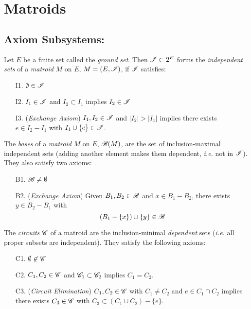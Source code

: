 \section{Matroids}

\subsection{Axiom Subsystems:}

\begin{definition}
    Let $E$ be a finite set called the \textit{ground set}.
    Then $\mathscr{I} \subset 2^E$ forms the \textit{independent sets} of a \textit{matroid} $M$ on $E$, $M = (E, \mathscr{I})$, if $\mathscr{I}$ satisfies:
    \begin{enumerate}
        \item[I1.] $\emptyset \in \mathscr{I}$
        \item[I2.] $I_1 \in \mathscr{I}$ and $I_2 \subset I_1$ implies $I_2 \in \mathscr{I}$
        \item[I3.] (\textit{Exchange Axiom}) $I_1, I_2 \in \mathscr{I}$ and $|I_2| > |I_1|$ implies there exists $e \in I_2 - I_1$ with $I_1 \cup \lbrace e \rbrace \in \mathscr{I}$.
    \end{enumerate}
\end{definition}    

\begin{definition}[Bases]
    The \textit{bases} of a \textit{matroid} $M$ on $E$, $\mathscr{B}(M)$, are the set of inclusion-maximal independent sets (adding another element makes them dependent, \textit{i.e.} not in $\mathscr{I}$).
    They also satisfy two axioms:
    \begin{enumerate}
        \item[B1.] $\mathscr{B} \neq \emptyset$
        \item[B2.] (\textit{Exchange Axiom}) Given $B_1, B_2 \in \mathscr{B}$ and $x \in B_1 - B_2$, there exists $y \in B_2 - B_1$ with
            $$ (B_1 - \{ x\}) \cup \{ y\} \in \mathscr{B}$$
    \end{enumerate}
\end{definition}

\begin{definition}[Circuits]
    The \textit{circuits} $\mathscr{C}$ of a matroid are the inclusion-minimal \textit{dependent} sets (\textit{i.e.} all proper subsets are independent).
    They satisfy the following axioms:
    \begin{enumerate}
        \item[C1.] $\emptyset \not\in \mathscr{C}$
        \item[C2.] $C_1, C_2 \in \mathscr{C}$ and $\mathscr{C}_1 \subset \mathscr{C}_2$ implies $C_1 = C_2$.
        \item[C3.] (\textit{Circuit Elimination}) $C_1, C_2 \in \mathscr{C}$ with $C_1 \neq C_2$ and $e \in C_1 \cap C_2$ implies there exists $C_3 \in \mathscr{C}$ with $C_3 \subset (C_1 \cup C_2) - \{ e \}$.
    \end{enumerate}
\end{definition}

